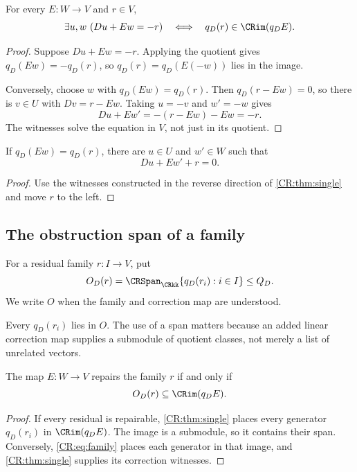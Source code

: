 \begin{CRtheorem}\label{CR:thm:single}
For every $E:W\to V$ and $r\in V$,
\begin{equation}\label{CR:eq:single}
\exists u,w\ (Du+Ew=-r)
\quad\Longleftrightarrow\quad
q_D(r)\in\CRim(q_DE).
\end{equation}
\end{CRtheorem}
\begin{proof}
Suppose $Du+Ew=-r$. Applying the quotient gives $q_D(Ew)=-q_D(r)$, so $q_D(r)=q_D(E(-w))$ lies in the image.

Conversely, choose $w$ with $q_D(Ew)=q_D(r)$. Then $q_D(r-Ew)=0$, so there is $v\in U$ with $Dv=r-Ew$. Taking $u=-v$ and $w'=-w$ gives
\[
Du+Ew'=-(r-Ew)-Ew=-r.
\]
The witnesses solve the equation in $V$, not just in its quotient.
\end{proof}

\begin{CRcorollary}\label{CR:cor:reconstruct}
If $q_D(Ew)=q_D(r)$, there are $u\in U$ and $w'\in W$ such that
\[
Du+Ew'+r=0.
\]
\end{CRcorollary}
\begin{proof}
Use the witnesses constructed in the reverse direction of \cref{CR:thm:single} and move $r$ to the left.
\end{proof}

\subsection{The obstruction span of a family}
\begin{CRdefinition}\label{CR:def:span}
For a residual family $r:I\to V$, put
\[
O_D(r)=\CRSpan_{\CRkk}\{q_D(r_i):i\in I\}\leq Q_D.
\]
We write $O$ when the family and correction map are understood.
\end{CRdefinition}

Every $q_D(r_i)$ lies in $O$. The use of a span matters because an added linear correction map supplies a submodule of quotient classes, not merely a list of unrelated vectors.

\begin{CRtheorem}\label{CR:thm:family}
The map $E:W\to V$ repairs the family $r$ if and only if
\begin{equation}\label{CR:eq:family}
O_D(r)\subseteq\CRim(q_DE).
\end{equation}
\end{CRtheorem}
\begin{proof}
If every residual is repairable, \cref{CR:thm:single} places every generator $q_D(r_i)$ in $\CRim(q_DE)$. The image is a submodule, so it contains their span. Conversely, \eqref{CR:eq:family} places each generator in that image, and \cref{CR:thm:single} supplies its correction witnesses.
\end{proof}

